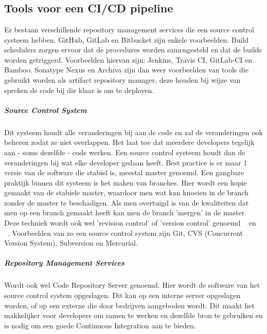 
\chapter{}
\label{ch:vergelijking-tools}

\section{Tools voor een CI/CD pipeline}
\label{sec:tools-voor-pipeline}
Er bestaan verschillende repository management services die een source control systeem hebben. GitHub, GitLab en Bitbucket zijn enkele voorbeelden.
Build schedulers zorgen ervoor dat de procedures worden samengesteld en dat de builds worden getriggerd. Voorbeelden hiervan zijn: Jenkins, Travis CI, GitLab-CI en Bamboo. Sonatype Nexus en Archiva zijn dan weer voorbeelden van tools die gebruikt worden als artifact repository manager, deze houden bij wijze van spreken de code bij die klaar is om te deployen. 

\paragraph{Source Control System}
Dit systeem houdt alle veranderingen bij aan de code en zal de veranderingen ook beheren zodat ze niet overlappen. Het laat toe dat meerdere developers tegelijk aan - soms dezelfde - code werken. Een source control systeem houdt dan de veranderingen bij wat elke developer gedaan heeft. Best practice is er maar 1 versie van de software die stabiel is, meestal master genoemd. Een gangbare praktijk binnen dit systeem is het maken van branches. Hier wordt een kopie gemaakt van de stabiele master, waardoor men wat kan knoeien in de branch zonder de master te beschadigen. Als men overtuigd is van de kwaliteiten dat men op een branch gemaakt heeft kan men de branch 'mergen' in de master. Deze techniek wordt ook wel 'revision control' of 'version control' genoemd ~\autocite{Skelton2014} en ~\autocite{Riti2018}.
Voorbeelden van zo een source control system zijn Git, CVS (Concurrent Version System), Subversion en Mercurial.

\paragraph{Repository Management Services}
Wordt ook wel Code Repository Server genoemd. Hier wordt de software van het source control system opgeslagen. Dit kan op een interne server opgeslagen worden, of op een externe die door bedrijven aangeboden wordt. Dit maakt het makkelijker voor developers om samen te werken en dezelfde bron te gebruiken en is nodig om een goede Continuous Integration aan te bieden.

